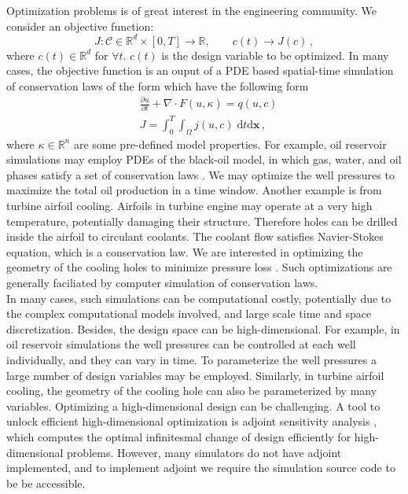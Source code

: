 \documentclass[a4paper,onecolumn]{article}
\theoremstyle{remark}
\begin{document}
Optimization problems is of great interest in the engineering community. We consider an
objective function:
$$
    J: \mathcal{C} \in \mathbb{R}^d\times [0,T] \rightarrow \mathbb{R}, \qquad c(t) \rightarrow J(c)\,,
$$
where $c(t) \in \mathbb{R}^d$ for $\forall t$. $c(t)$ is the design variable to be optimized.
In many cases, the objective function is an ouput of
a PDE based spatial-time simulation of conservation laws of the form which have the following form 
\begin{equation}\begin{split}
    &\frac{\partial u}{\partial t} + \nabla \cdot F(u, \kappa) = q(u,c)\\
    &J = \int_0^T\int_\Omega j(u,c) \; \textrm{d}t \textrm{d}\mathbf{x}\,,
\end{split}\end{equation}
where $\kappa\in \mathbb{R}^n$ are some pre-defined model properties.
For example, oil reservoir simulations may employ PDEs of the black-oil model, 
in which gas, water, and oil phases satisfy a set of conservation laws 
\cite{reservoir simulation book}. 
We may optimize the well pressures to maximize the total oil production in a time window.
Another example is from turbine airfoil cooling. Airfoils in turbine engine may operate at a very high temperature,
potentially damaging their structure. Therefore holes can be drilled inside the airfoil to circulant coolants.
The coolant flow satisfies Navier-Stokes equation, which is a conservation law. We are interested in
optimizing the geometry of the cooling holes to minimize pressure loss 
\cite{ubend rans opt 1, ubend rans opt 2}.
Such optimizations are generally faciliated by computer simulation of conservation laws.\\

\noindent 
In many cases, such simulations can be computational costly, potentially due to the complex computational models involved, and
large scale time and space discretization. Besides, the design space can be high-dimensional. 
For example, in oil reservoir simulations the well pressures can be controlled at each well
individually, and they can vary in time. To parameterize the well pressures a large number of
design variables may be employed. Similarly, in turbine airfoil cooling,
the geometry of the cooling hole can also be parameterized by many variables.
Optimizing a high-dimensional design
can be challenging.
A tool to unlock efficient high-dimensional optimization is adjoint sensitivity analysis
\cite{cont discretize adjoint}
, which computes the optimal infinitesmal change of
design efficiently for high-dimensional problems. However, many simulators do not have adjoint implemented, and to implement adjoint we require the simulation source code to be 
be accessible.\\
\end{document}
